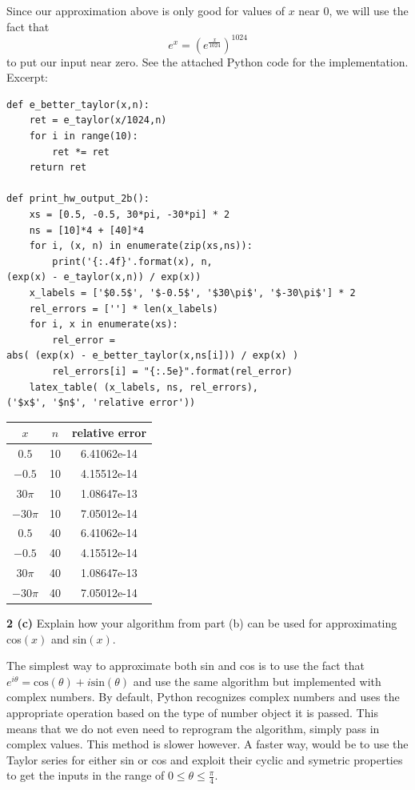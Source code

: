 \documentclass[12pt]{article}
\begin{document}
	Since our approximation above is only good for values of $x$ near $0$, we will use the fact that $$e^x=(e^{\frac{x}{1024}})^{1024}$$ to put our input near zero. See the attached Python code for the implementation. \\
	Excerpt: \\
	\begin{lstlisting}
def e_better_taylor(x,n):
	ret = e_taylor(x/1024,n)
	for i in range(10):
		ret *= ret
	return ret
		
def print_hw_output_2b():
	xs = [0.5, -0.5, 30*pi, -30*pi] * 2
	ns = [10]*4 + [40]*4
	for i, (x, n) in enumerate(zip(xs,ns)):
		print('{:.4f}'.format(x), n, 
(exp(x) - e_taylor(x,n)) / exp(x))	
	x_labels = ['$0.5$', '$-0.5$', '$30\pi$', '$-30\pi$'] * 2
	rel_errors = [''] * len(x_labels)
	for i, x in enumerate(xs):
		rel_error = 
abs( (exp(x) - e_better_taylor(x,ns[i])) / exp(x) )
		rel_errors[i] = "{:.5e}".format(rel_error)
	latex_table( (x_labels, ns, rel_errors), 
('$x$', '$n$', 'relative error'))
	\end{lstlisting}
	
	\begin{center}
		\begin{tabular}{|c|c|c|}
			\hline
			$x$ & $n$ & relative error \\ \hline
			$0.5$ & 10 & 6.41062e-14 \\ \hline
			$-0.5$ & 10 & 4.15512e-14 \\ \hline
			$30\pi$ & 10 & 1.08647e-13 \\ \hline
			$-30\pi$ & 10 & 7.05012e-14 \\ \hline
			$0.5$ & 40 & 6.41062e-14 \\ \hline
			$-0.5$ & 40 & 4.15512e-14 \\ \hline
			$30\pi$ & 40 & 1.08647e-13 \\ \hline
			$-30\pi$ & 40 & 7.05012e-14 \\ \hline
		\end{tabular}
	\end{center}

\hspace{-7 ex}\textbf{2 (c)} Explain how your algorithm from part (b) can be used for approximating cos$(x)$ and sin$(x)$. \bigbreak

	The simplest way to approximate both sin and cos is to use the fact that $e^{i\theta} = \text{cos}(\theta) + i\text{sin}(\theta)$ and use the same algorithm but implemented with complex numbers. By default, Python recognizes complex numbers and uses the appropriate operation based on the type of number object it is passed. This means that we do not even need to reprogram the algorithm, simply pass in complex values. This method is slower however. A faster way, would be to use the Taylor series for either sin or cos and exploit their cyclic and symetric properties to get the inputs in the range of $0 \leq \theta \leq \frac{\pi}{4}$.
\end{document}

